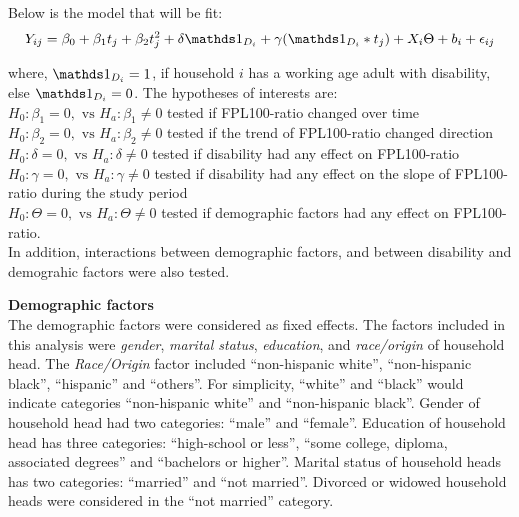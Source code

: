 \documentclass[11pt]{extarticle} %
\begin{document}
Below is the model that will be fit: 
\vspace{-0.5cm}
\begin{equation}
Y_{ij} = \beta_0 + \beta_1 t_j + \beta_2 t_j^2 + \delta \Ind_{D_i} + \gamma(\Ind_{D_i}*t_j) + X_i\Theta + b_i + \epsilon_{ij}
\label{eq:MixedEffects2}
\end{equation}

where, $\Ind_{D_i} = 1$, if household $i$ has a working age adult with disability, else $\Ind_{D_i} = 0$. The hypotheses of interests are: \\
$H_0: \beta_1 = 0, \text{  vs  } H_a: \beta_1 \ne 0$ tested if FPL100-ratio changed over time \\
$H_0: \beta_2 = 0, \text{  vs  } H_a: \beta_2 \ne 0$ tested if the trend of FPL100-ratio changed direction \\
$H_0: \delta = 0, \text{  vs  } H_a: \delta \ne 0$ tested if disability had any effect on FPL100-ratio\\
$H_0: \gamma = 0, \text{  vs  } H_a: \gamma \ne 0$ tested if disability had any effect on the slope of FPL100-ratio during the study period\\
$H_0: \Theta = 0, \text{  vs  } H_a: \Theta \ne 0$ tested if demographic factors had any effect on FPL100-ratio. \\
In addition, interactions between demographic factors, and between disability and demograhic factors were also tested. 

\noindent
{\bf{Demographic factors}}\\
The demographic factors were considered as fixed effects. The factors included in this analysis were {\emph{gender}}, {\emph{marital status}}, {\emph{education}}, and {\emph{race/origin}} of household head. The {\emph{Race/Origin}} factor included ``non-hispanic white'', ``non-hispanic black'', ``hispanic'' and ``others''. For simplicity, ``white'' and ``black'' would indicate categories ``non-hispanic white'' and ``non-hispanic black''. Gender of household head had two categories: ``male'' and ``female''. Education of household head has three categories: ``high-school or less'', ``some college, diploma, associated degrees'' and ``bachelors or higher''. Marital status of household heads has two categories: ``married'' and ``not married''. Divorced or widowed household heads were considered in the ``not married'' category. 
\end{document}
